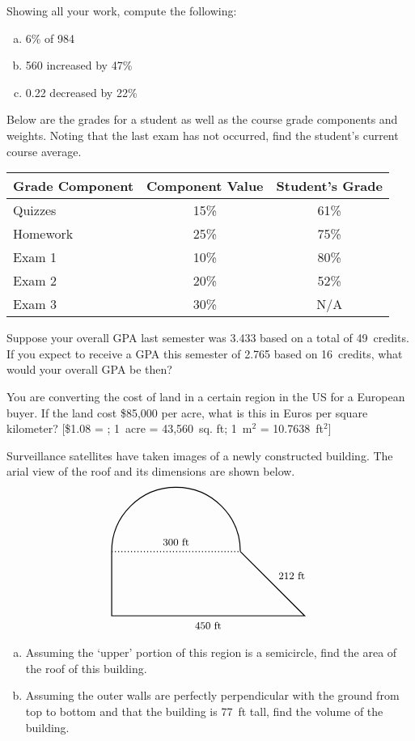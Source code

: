 \documentclass[12pt,letterpaper]{exam}
\begin{document}
\begin{questions}
\newpage
\question[10] Showing all your work, compute the following:
	\begin{enumerate}[(a)]
	\item 6\% of 984
	\item 560 increased by 47\%
	\item 0.22 decreased by 22\%
	\end{enumerate}



\newpage
\question[10] Below are the grades for a student as well as the course grade components and weights. Noting that the last exam has not occurred, find the student's current course average. \par
	\begin{table}[ht]
	\centering
	\begin{tabular}{lcc}
	Grade Component & Component Value & Student's Grade \\ \hline
	Quizzes & 15\% & 61\% \\
	Homework & 25\% & 75\% \\
	Exam 1 & 10\% & 80\% \\
	Exam 2 & 20\% & 52\% \\
	Exam 3 & 30\% & N/A \\
	\end{tabular}
	\end{table}



\newpage
\question[10] Suppose your overall GPA last semester was 3.433 based on a total of 49~credits. If you expect to receive a GPA this semester of 2.765 based on 16~credits, what would your overall GPA be then?



\newpage
\question[10] You are converting the cost of land in a certain region in the US for a European buyer. If the land cost \$85,000 per acre, what is this in Euros per square kilometer? [\$1.08 = ; 1~acre = 43,560~sq. ft; 1~m$^2$ = 10.7638~ft$^2$]



\newpage
\question[10] Surveillance satellites have taken images of a newly constructed building. The arial view of the roof and its dimensions are shown below.
	\[
	\begin{tikzpicture}
	\draw[line width=0.03cm] (0,2) -- (0,0) -- (4,0) -- (6,0) -- (4,2);
	\draw[line width=0.03cm] (4,2) arc (0:180:2);
	\draw[line width=0.03cm,dotted] (0,2) -- (4,2);
	\node at (2,2.3) {\small 300~ft};
	\node at (3,-0.3) {\small 450~ft};
	\node at (5.6,1.25) {\small 212~ft};
	\end{tikzpicture}
	\]
	
\begin{enumerate}[(a)]
\item Assuming the `upper' portion of this region is a semicircle, find the area of the roof of this building.
\item Assuming the outer walls are perfectly perpendicular with the ground from top to bottom and that the building is 77~ft tall, find the volume of the building. 
\end{enumerate}


\end{questions}
\end{document}
